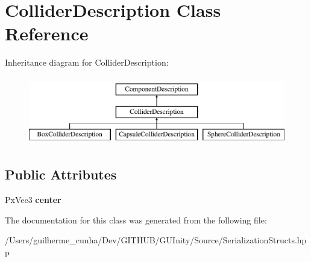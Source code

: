 \hypertarget{class_collider_description}{}\section{Collider\+Description Class Reference}
\label{class_collider_description}
Inheritance diagram for Collider\+Description\+:\begin{figure}[H]
\begin{center}
\leavevmode
\includegraphics[height=3.000000cm]{class_collider_description}
\end{center}
\end{figure}
\subsection*{Public Attributes}
\begin{DoxyCompactItemize}
\item 
\hypertarget{class_collider_description_a424117a32221edd34084671567d8a0e4}{}Px\+Vec3 {\bfseries center}\label{class_collider_description_a424117a32221edd34084671567d8a0e4}

\end{DoxyCompactItemize}


The documentation for this class was generated from the following file\+:\begin{DoxyCompactItemize}
\item 
/\+Users/guilherme\+\_\+cunha/\+Dev/\+G\+I\+T\+H\+U\+B/\+G\+U\+Inity/\+Source/Serialization\+Structs.\+hpp\end{DoxyCompactItemize}
